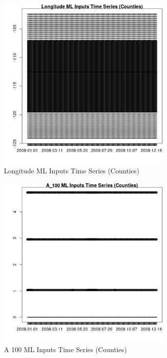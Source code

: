 \begin{figure} 
\centering  
\includegraphics[width=0.77\textwidth]{Code_Outputs/ML_input_report_ML_input_CountyGeometricCentroids_Locations_Dates_part_c_2008-01-01to2008-12-31_LongitudeTS.jpg} 
\caption{\label{fig:ML_input_report_ML_input_CountyGeometricCentroids_Locations_Dates_part_c_2008-01-01to2008-12-31LongitudeTS}Longitude ML Inputs Time Series (Counties)} 
\end{figure} 
 

\begin{figure} 
\centering  
\includegraphics[width=0.77\textwidth]{Code_Outputs/ML_input_report_ML_input_CountyGeometricCentroids_Locations_Dates_part_c_2008-01-01to2008-12-31_A_100TS.jpg} 
\caption{\label{fig:ML_input_report_ML_input_CountyGeometricCentroids_Locations_Dates_part_c_2008-01-01to2008-12-31A_100TS}A 100 ML Inputs Time Series (Counties)} 
\end{figure} 
 

